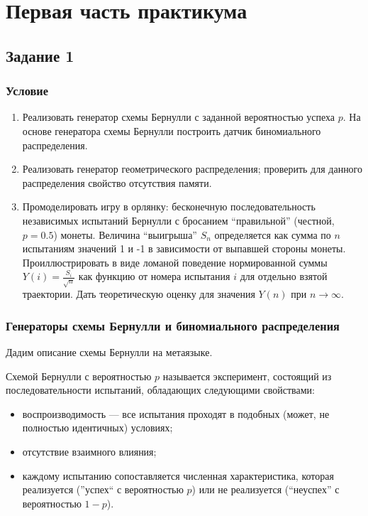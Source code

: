 \documentclass[11pt]{report}
\begin{document}
\newpage %

\tableofcontents

\newpage %

\chapter{Первая часть практикума}

\section{Задание 1}

\subsection{Условие}

\begin{enumerate}
\item Реализовать генератор схемы Бернулли с заданной вероятностью успеха $p$. На основе генератора схемы Бернулли построить датчик биномиального распределения.
\item Реализовать генератор геометрического распределения; проверить для данного распределения свойство отсутствия памяти.
\item Промоделировать игру в орлянку: бесконечную последовательность независимых испытаний Бернулли 
с бросанием “правильной” (честной, $p=0.5$) монеты. Величина “выигрыша” $S_n$ определяется как сумма 
по $n$ испытаниям значений 1 и -1 в зависимости от выпавшей стороны монеты. Проиллюстрировать в виде
ломаной поведение нормированной суммы $Y(i)=\frac{S_i}{\sqrt{n}}$ как функцию от номера испытания $i$ 
для отдельно взятой траектории. Дать теоретическую оценку для значения $Y(n)$ при $n\to\infty$.
\end{enumerate}

\subsection{Генераторы схемы Бернулли и биномиального распределения}

Дадим описание схемы Бернулли на метаязыке.

\begin{definition}
Схемой Бернулли с вероятностью $p$ называется эксперимент, состоящий из последовательности испытаний, обладающих следующими свойствами:
\begin{itemize}
    \item воспроизводимость --- все испытания проходят в подобных (может, не полностью идентичных) условиях;
    \item отсутствие взаимного влияния;
    \item каждому испытанию сопоставляется численная характеристика, которая реализуется (''успех`` с вероятностью $p$) или не реализуется (``неуспех'' с вероятностью $1-p$).
\end{itemize}
\end{definition}
\end{document}
